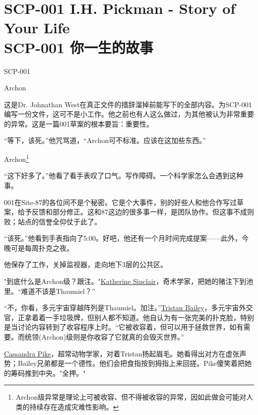 \chapter[SCP-001 你一生的故事]{
    SCP-001 I.H. Pickman - Story of Your Life \\
    SCP-001 你一生的故事
}

\label{chap:SCP-001.story.of.your.life}

\begin{scpbox}

SCP-001

Archon

\end{scpbox}

这是Dr. Johnathan West在真正文件的措辞溜掉前能写下的全部内容。为SCP-001编写一份文件，这可不是小工作。他之前也有人这么做过，为其他被认为非常重要的异常。这是一篇001草案的根本要旨：重要性。

“等下，该死。”他咒骂道，“Archon可不标准。应该在这加些东西。”

\begin{scpbox}

Archon\footnote{Archon级异常是理论上可被收容、但不得被收容的异常，因如此做会可能对人类的持续存在造成灾难性影响。}

\end{scpbox}

“这下好多了。”他看了看手表叹了口气。写作障碍。一个科学家怎么会遇到这种事。

001在Site-87的各位间不是个秘密。它是个大事件，别的好些人和他合作写过草案，给予反馈和部分修正。这和87这边的很多事一样，是团队协作。但这事不成则败；站点的信誉全仰仗于此了。

“该死。”他看到手表指向了5:00。好吧，他还有一个月时间完成提案——此外，今晚可是每周扑克之夜。

他保存了工作，关掉监视器，走向地下3层的公共区。

\hr

"到底什么是Archon级？跟注。"\hyperref[chap:]{Katherine Sinclair}，奇术学家，把她的赌注下到池里。“难道不该是Thaumiel？”

“不，你看，多元宇宙穿越阵列是Thaumiel。加注。”\hyperref[chap:]{Tristan Bailey}，多元宇宙外交官，正拿着着一手垃圾牌，但别人都不知道。他自认为有一张完美的扑克脸，特别是当讨论内容转到了收容程序上时。“它被收容着，但可以用于拯救世界，如有需要。而统领(Archon)级则是你收容了它就真的会毁灭世界。”

\hyperref[chap:SCP-3773]{Cassandra Pike}，超常动物学家，对着Tristan扬起眉毛。她看得出对方在虚张声势；Bailey兄弟都是一个德性。他们会把食指按到拇指上来回搓。Pike傻笑着把她的筹码推到中央。"全押。"

